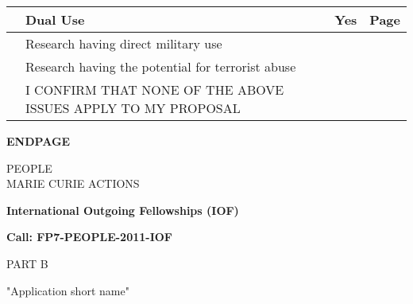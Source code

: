 \documentclass[11pt]{ltxdoc}
\newcommand{\CallName}{International Outgoing Fellowships (IOF)}
\newcommand{\CallID}{FP7-PEOPLE-2011-IOF}
\newcommand{\AppShortTitle}{Application short name}
\begin{document}
\vspace{0.5cm}
\begin{tabularx}{\linewidth}{ | c | X | c | c | }
\rowcolor{black} & {\centering\arraybackslash \color{white} \bf Dual Use} & {\color{white} \bf Yes} & {\color{white} \bf Page} \\ \hline
   & Research having direct military use                          & & \\ \hline
   & Research having the potential for terrorist abuse            & & \\ \hline
   & I CONFIRM THAT NONE OF THE ABOVE ISSUES APPLY TO MY PROPOSAL & & \cellcolor[gray]{0.8}\\ \hline
\end{tabularx}


\clearpage

\thispagestyle{empty}
\begin{center}

\Huge{\bf ENDPAGE}

\vspace{4cm}

\Large{PEOPLE\\MARIE CURIE ACTIONS}

\vspace{4cm}

\Large{\bf \CallName}

\Large{\bf Call: \CallID}

\vspace{4cm}

\huge{PART B}

\vspace{4cm}

\huge{"\AppShortTitle"}

\end{center}
\end{document}
